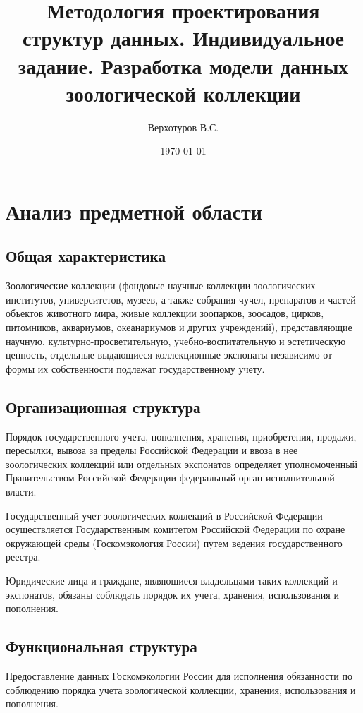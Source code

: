 \documentclass[10pt, a4paper, titlepage]{article}
\title{Методология проектирования структур данных. Индивидуальное задание. Разработка модели данных зоологической коллекции}
\author{Верхотуров В.С.}
\affil{БСБО-05-20}
\affil{РТУ МИРЭА}
\date\today
\begin{document}
\maketitle

\tableofcontents
\newpage

\section{Анализ предметной области}

\subsection{Общая характеристика}

Зоологические коллекции (фондовые научные коллекции зоологических институтов, университетов, музеев, а также собрания чучел, препаратов и частей объектов животного мира, живые коллекции зоопарков, зоосадов, цирков, питомников, аквариумов, океанариумов и других учреждений), представляющие научную, культурно-просветительную, учебно-воспитательную и эстетическую ценность, отдельные выдающиеся коллекционные экспонаты независимо от формы их собственности подлежат государственному учету.

\subsection{Организационная структура}
\label{sec:organizationalStructure}

Порядок государственного учета, пополнения, хранения, приобретения, продажи, пересылки, вывоза за пределы Российской Федерации и ввоза в нее зоологических коллекций или отдельных экспонатов определяет уполномоченный Правительством Российской Федерации федеральный орган исполнительной власти.

Государственный учет зоологических коллекций в Российской Федерации осуществляется Государственным комитетом Российской Федерации по охране окружающей среды (Госкомэкология России) путем ведения государственного реестра.

Юридические лица и граждане, являющиеся владельцами таких коллекций и экспонатов, обязаны соблюдать порядок их учета, хранения, использования и пополнения.

\subsection{Функциональная структура}

Предоставление данных Госкомэкологии России для исполнения обязанности по соблюдению порядка учета зоологической коллекции, хранения, использования и пополнения.
\end{document}
